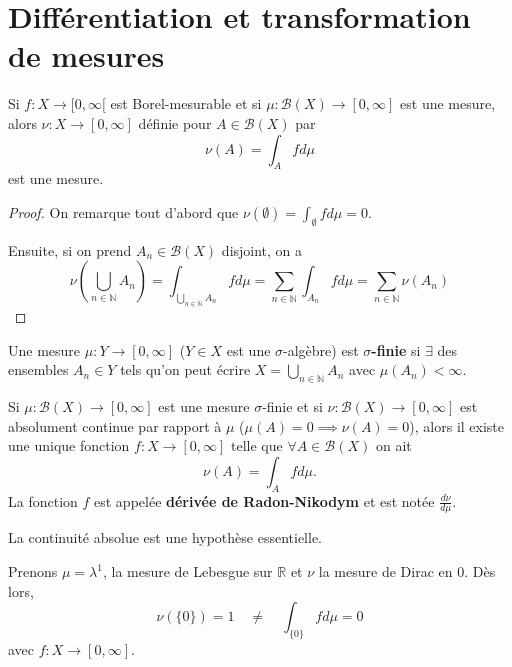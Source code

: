 \section{Différentiation et transformation de mesures}
\begin{theo}
    Si $f:X\to[0,\infty[$ est Borel-mesurable et si $\mu:\mathscr{B}(X)\to[0,\infty]$ est une mesure, alors $\nu:X\to[0,\infty]$ définie pour $A\in\mathscr{B}(X)$ par
    \begin{equation*}
        \nu(A)=\int_Afd\mu
    \end{equation*}
    est une mesure.
\end{theo}
\begin{proof}
    On remarque tout d'abord que $\nu(\emptyset)=\int_\emptyset fd\mu=0$.
    
    Ensuite, si on prend $A_n\in\mathscr{B}(X)$ disjoint, on a
    \begin{equation*}
        \nu\left(\bigcup_{n\in\mathbb{N}}A_n\right) = \int_{\bigcup_{n\in\mathbb{N}}A_n}fd\mu=\sum_{n\in\mathbb{N}}\int_{A_n}fd\mu = \sum_{n\in\mathbb{N}}\nu(A_n)
    \end{equation*}
\end{proof}

\begin{definition}
    Une mesure $\mu:Y\to[0,\infty]$ ($Y\in X$ est une $\sigma$-algèbre) est \textbf{$\sigma$-finie} si $\exists$ des ensembles $A_n\in Y$ tels qu'on peut écrire $X=\bigcup_{n\in\mathbb{N}}A_n$ avec $\mu(A_n)<\infty$.
\end{definition}

\begin{theo}
    Si $\mu:\mathscr{B}(X)\to[0,\infty]$ est une mesure $\sigma$-finie et si $\nu:\mathscr{B}(X)\to[0,\infty]$ est absolument continue par rapport à $\mu$ ($\mu(A)=0\implies\nu(A)=0$), alors il existe une unique fonction $f:X\to[0,\infty]$ telle que $\forall A\in\mathscr{B}(X)$ on ait
    \begin{equation*}
        \nu(A)=\int_Afd\mu.
    \end{equation*}
    La fonction $f$ est appelée \textbf{dérivée de Radon-Nikodym} et est notée $\frac{d\nu}{d\mu}$. 
\end{theo}

\begin{remark}
    La continuité absolue est une hypothèse essentielle.
\end{remark}
\begin{example}
    Prenons $\mu=\lambda^1$, la mesure de Lebesgue sur $\mathbb{R}$ et $\nu$ la mesure de Dirac en $0$. Dès lors,
    \begin{equation*}
        \nu(\{0\}) = 1 \quad \neq \quad \int_{\{0\}}fd\mu=0
    \end{equation*}
    avec $f:X\to[0,\infty]$.
\end{example}

